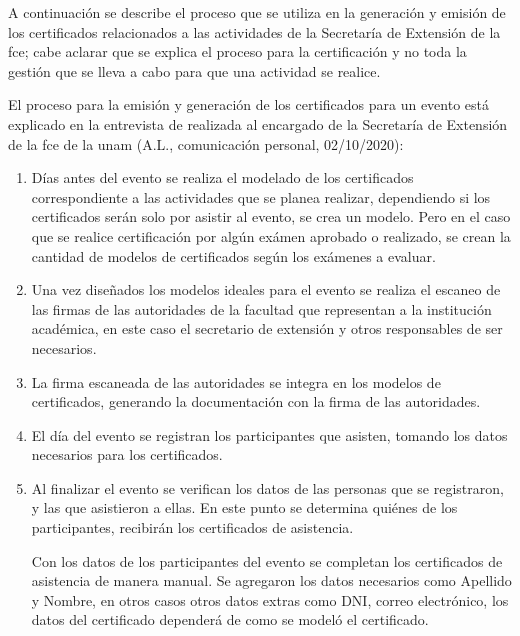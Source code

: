 A continuación se describe el  proceso que se utiliza en la generación y emisión de los certificados 
relacionados a las actividades de la Secretaría de Extensión de la \gls{fce}; cabe aclarar que 
se explica el proceso para la certificación y no toda la gestión que se lleva a cabo
para que una actividad se realice. 

El proceso para la emisión y generación de los certificados para un evento está explicado en la entrevista de realizada al encargado de 
la Secretaría de Extensión de la \gls{fce} de la \gls{unam} (A.L., comunicación personal, 02/10/2020):%

\begin{enumerate}
    \item Días antes del evento se realiza el modelado de los certificados correspondiente a las actividades 
    que se planea realizar, dependiendo si los certificados serán solo por asistir al evento, se crea un modelo.
    Pero en el caso que se realice certificación por algún exámen aprobado o realizado, se crean 
    la cantidad de modelos de certificados según los exámenes a evaluar. 
  
    \item Una vez diseñados los modelos ideales para el evento se realiza el escaneo de las firmas de las autoridades de la facultad
    que representan a la institución académica, en este caso el secretario de extensión y otros responsables de ser necesarios.

    \item La firma escaneada de las autoridades se integra en los modelos de certificados, generando la documentación con la firma de las autoridades.


    \item El día del evento se registran los participantes que asisten, tomando los datos necesarios para los certificados.

    \item Al finalizar el evento se verifican los datos de las personas que se  registraron, y 
    las que asistieron a ellas. En este punto se determina quiénes de los participantes, recibirán 
    los certificados de asistencia.

    Con los datos de los participantes del evento se completan
    los certificados de asistencia de manera manual. Se agregaron los datos necesarios como 
    Apellido y Nombre, en otros casos otros datos extras como DNI, correo electrónico, 
    los datos del certificado dependerá de como se modeló el certificado.


\end{enumerate}
